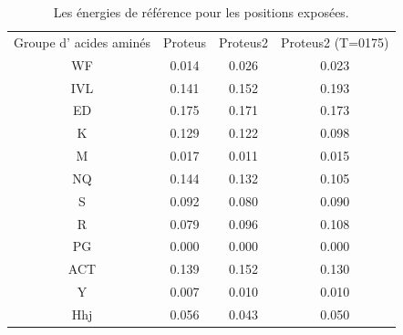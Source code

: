     \begin{table}[!htbp]
      \centering

      \begin{tabular}{cccc}

        \toprule
        Groupe d' acides aminés & Proteus & Proteus2 & Proteus2 (T=0175)\\
        \cmidrule{1-4}


        WF  & 0.014  & 0.026   &  0.023 \\
        IVL & 0.141  & 0.152   &  0.193 \\
        ED  & 0.175  & 0.171   &  0.173 \\
        K   & 0.129  & 0.122   &  0.098 \\
        M   & 0.017  & 0.011   &  0.015 \\
        NQ  & 0.144  & 0.132   &  0.105 \\
        S   & 0.092  & 0.080   &  0.090 \\
        R   & 0.079  & 0.096   &  0.108 \\
        PG  & 0.000  & 0.000   &  0.000 \\
        ACT & 0.139  & 0.152   &  0.130 \\
        Y   & 0.007  & 0.010   &  0.010 \\
        Hhj & 0.056  & 0.043   &  0.050 \\


        \bottomrule


      \end{tabular}      
      \caption{Les énergies de référence pour les positions exposées.}
\label{tab:RefEner_groupes}      
    \end{table}



    \clearpage


